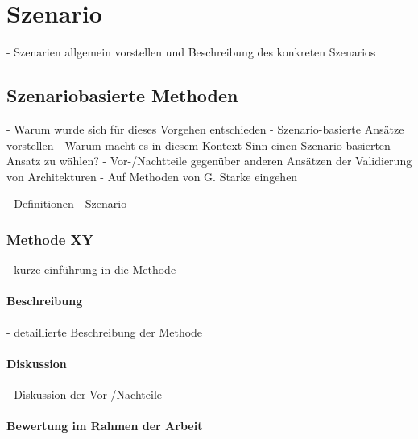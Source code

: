 
\chapter{Szenario} %
\label{cha:szenario}

  - Szenarien allgemein vorstellen und Beschreibung des konkreten Szenarios
  
\section{Szenariobasierte Methoden} %
\label{sec:szenariobasierte_methoden}
  
- Warum wurde sich für dieses Vorgehen entschieden
- Szenario-basierte Ansätze vorstellen
- Warum macht es in diesem Kontext Sinn einen Szenario-basierten Ansatz zu wählen?
- Vor-/Nachtteile gegenüber anderen Ansätzen der Validierung von Architekturen
- Auf Methoden von G. Starke eingehen

- Definitionen
  - Szenario

\subsection{Methode XY} %
\label{sub:methode_xy}

 - kurze einführung in die Methode

\subsubsection{Beschreibung} %
\label{ssub:beschreibung}

  - detaillierte Beschreibung der Methode


\subsubsection{Diskussion} %
\label{ssub:diskussion}

 - Diskussion der Vor-/Nachteile


\subsubsection{Bewertung im Rahmen der Arbeit} %
\label{ssub:bewertung_im_rahmen_der_arbeit}

